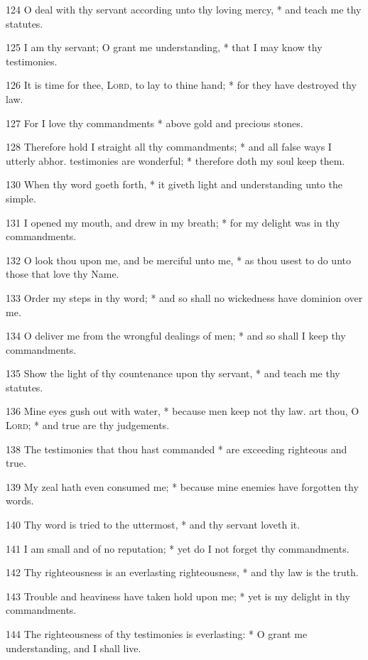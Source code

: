 124 O deal with thy servant according unto thy loving mercy, * and teach me thy statutes.\par
125 I am thy servant; O grant me understanding, * that I may know thy testimonies.\par
126 It is time for thee, {\textsc{Lord}}, to lay to thine hand; * for they have destroyed thy law.\par
127 For I love thy commandments * above gold and precious stones.\par
128 Therefore hold I straight all thy commandments; * and all false ways I utterly abhor.
 testimonies are wonderful; * therefore doth my soul keep them.\par
130 When thy word goeth forth, * it giveth light and understanding unto the simple.\par
131 I opened my mouth, and drew in my breath; * for my delight was in thy commandments.\par
132 O look thou upon me, and be merciful unto me, * as thou usest to do unto those that love thy Name.\par
133 Order my steps in thy word; * and so shall no wickedness have dominion over me.\par
134 O deliver me from the wrongful dealings of men; * and so shall I keep thy commandments.\par
135 Show the light of thy countenance upon thy servant, * and teach me thy statutes.\par
136 Mine eyes gush out with water, * because men keep not thy law.
 art thou, O {\textsc{Lord}}; * and true are thy judgements.\par
138 The testimonies that thou hast commanded * are exceeding righteous and true.\par
139 My zeal hath even consumed me; * because mine enemies have forgotten thy words.\par
140 Thy word is tried to the uttermost, * and thy servant loveth it.\par
141 I am small and of no reputation; * yet do I not forget thy commandments.\par
142 Thy righteousness is an everlasting righteousness, * and thy law is the truth.\par
143 Trouble and heaviness have taken hold upon me; * yet is my delight in thy commandments.\par
144 The righteousness of thy testimonies is everlasting: * O grant me understanding, and I shall live.
